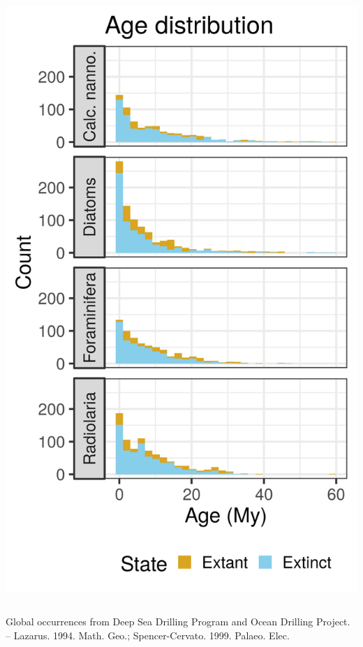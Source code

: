\documentclass{beamer}
\begin{document}
\begin{frame}
\begin{columns}
\begin{column}{0.4\textwidth}
      \includegraphics[width=\textwidth,height=0.8\textheight,keepaspectratio=true]{../results/figure/age_label_full}
    \end{column}
  \end{columns}

  \footnotesize{Global occurrences from Deep Sea Drilling Program and Ocean Drilling Project. -- Lazarus. 1994. Math. Geo.; Spencer-Cervato. 1999. Palaeo. Elec.}

\end{frame}
\end{document}
